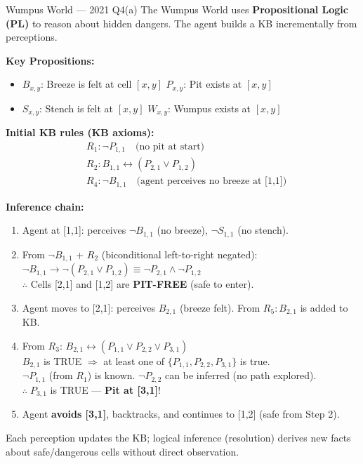 \documentclass[12pt,a4paper]{article}
\newcommand{\ra}{\rightarrow}
\newcommand{\lra}{\leftrightarrow}
\begin{document}
\begin{solbox}{Wumpus World --- 2021 Q4(a)}
The Wumpus World uses \textbf{Propositional Logic (PL)} to reason about hidden dangers. The agent builds a KB incrementally from perceptions.

\medskip
\textbf{Key Propositions:}
\begin{itemize}[noitemsep]
  \item $B_{x,y}$: Breeze is felt at cell $[x,y]$ \quad $P_{x,y}$: Pit exists at $[x,y]$
  \item $S_{x,y}$: Stench is felt at $[x,y]$ \quad $W_{x,y}$: Wumpus exists at $[x,y]$
\end{itemize}

\textbf{Initial KB rules (KB axioms):}
\begin{align*}
  &R_1: \neg P_{1,1} \quad\text{(no pit at start)}\\
  &R_2: B_{1,1} \lra (P_{2,1} \lor P_{1,2})\\
  &R_4: \neg B_{1,1} \quad\text{(agent perceives no breeze at [1,1])}
\end{align*}

\textbf{Inference chain:}
\begin{enumerate}[noitemsep,label=\textbf{\arabic*.}]
  \item Agent at [1,1]: perceives $\neg B_{1,1}$ (no breeze), $\neg S_{1,1}$ (no stench).
  \item From $\neg B_{1,1}$ + $R_2$ (biconditional left-to-right negated):\\
        $\neg B_{1,1} \ra \neg(P_{2,1} \lor P_{1,2}) \equiv \neg P_{2,1} \land \neg P_{1,2}$\\
        $\therefore$ Cells [2,1] and [1,2] are \textbf{PIT-FREE} (safe to enter).
  \item Agent moves to [2,1]: perceives $B_{2,1}$ (breeze felt). From $R_5: B_{2,1}$ is added to KB.
  \item From $R_3$: $B_{2,1} \lra (P_{1,1} \lor P_{2,2} \lor P_{3,1})$\\
        $B_{2,1}$ is TRUE $\Rightarrow$ at least one of $\{P_{1,1}, P_{2,2}, P_{3,1}\}$ is true.\\
        $\neg P_{1,1}$ (from $R_1$) is known. $\neg P_{2,2}$ can be inferred (no path explored).\\
        $\therefore\;P_{3,1}$ is TRUE --- \textbf{Pit at [3,1]}!
  \item Agent \textbf{avoids [3,1]}, backtracks, and continues to [1,2] (safe from Step 2).
\end{enumerate}

Each perception updates the KB; logical inference (resolution) derives new facts about safe/dangerous cells without direct observation.
\end{solbox}
\end{document}
